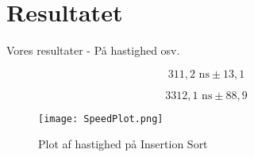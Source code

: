 \documentclass[class=report, crop=false]{standalone}
\begin{document}
    \section{Resultatet}
    Vores resultater -\> På hastighed osv.
    
    \begin{tcolorbox}
         \[ 311,2 \text{ ns} \pm 13,1  \]
    \end{tcolorbox}
    \begin{tcolorbox}
         \[ 3312,1 \text{ ns} \pm 88,9  \]
    \end{tcolorbox}

    \begin{tcolorbox}
        \begin{figure}[H]
            \centering
            \texttt{[image: SpeedPlot.png]}
            \caption{Plot af hastighed på Insertion Sort}
            \label{fig:SpeedPlot}
        \end{figure}
    \end{tcolorbox}
\end{document}
